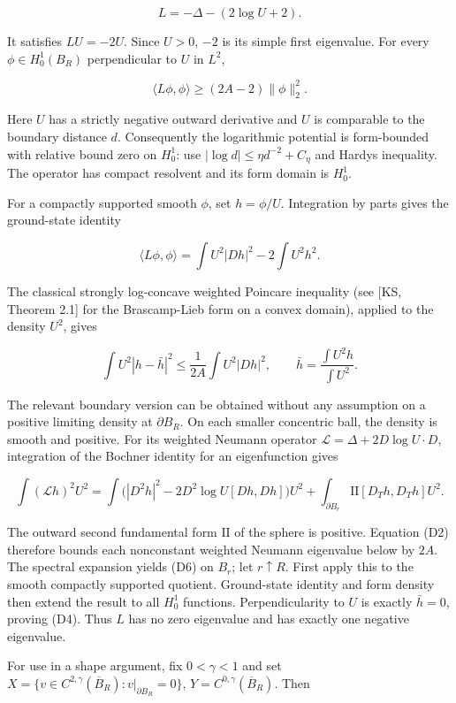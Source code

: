 \documentclass[11pt]{article}
\begin{document}
\[L=-\Delta-(2\log U+2). \tag{D3}\]

It satisfies \(LU=-2U\). Since \(U>0\), \(-2\) is its simple first
eigenvalue. For every \(\phi\in H_0^1(B_R)\) perpendicular to \(U\) in
\(L^2\),

\[\langle L\phi,\phi\rangle\geq(2A-2)\|\phi\|_2^2. \tag{D4}\]

Here \(U\) has a strictly negative outward derivative and \(U\) is
comparable to the boundary distance \(d\). Consequently the logarithmic
potential is form-bounded with relative bound zero on \(H_0^1\): use
\(|\log d|\leq\eta d^{-2}+C_\eta\) and Hardy\textquotesingle s
inequality. The operator has compact resolvent and its form domain is
\(H_0^1\).

For a compactly supported smooth \(\phi\), set \(h=\phi/U\). Integration
by parts gives the ground-state identity

\[\langle L\phi,\phi\rangle
 =\int U^2|Dh|^2-2\int U^2h^2. \tag{D5}\]

The classical strongly log-concave weighted Poincare inequality (see
{[}KS, Theorem 2.1{]} for the Brascamp-Lieb form on a convex domain),
applied to the density \(U^2\), gives

\[\int U^2|h-\bar h|^2\leq\frac1{2A}\int U^2|Dh|^2,
\qquad \bar h=\frac{\int U^2h}{\int U^2}. \tag{D6}\]

The relevant boundary version can be obtained without any assumption on
a positive limiting density at \(\partial B_R\). On each smaller
concentric ball, the density is smooth and positive. For its weighted
Neumann operator \(\mathcal L=\Delta+2D\log U\cdot D\), integration of
the Bochner identity for an eigenfunction gives

\[\int(\mathcal L h)^2U^2
=\int\bigl(|D^2h|^2-2D^2\log U[Dh,Dh]\bigr)U^2
 +\int_{\partial B_r}\mathrm{II}[D_T h,D_T h]U^2. \tag{D7}\]

The outward second fundamental form \(\mathrm{II}\) of the sphere is
positive. Equation (D2) therefore bounds each nonconstant weighted
Neumann eigenvalue below by \(2A\). The spectral expansion yields (D6)
on \(B_r\); let \(r\uparrow R\). First apply this to the smooth
compactly supported quotient. Ground-state identity and form density
then extend the result to all \(H_0^1\) functions. Perpendicularity to
\(U\) is exactly \(\bar h=0\), proving (D4). Thus \(L\) has no zero
eigenvalue and has exactly one negative eigenvalue.

For use in a shape argument, fix \(0<\gamma<1\) and set
\(X=\{v\in C^{2,\gamma}(\overline B_R):v|_{\partial B_R}=0\}\),
\(Y=C^{0,\gamma}(\overline B_R)\). Then
\end{document}
